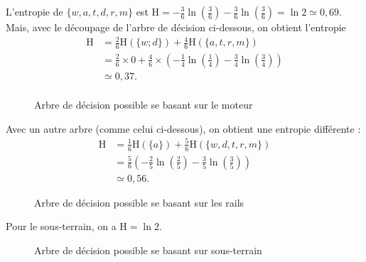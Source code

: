L'entropie de $\{w,a,t,d,r,m\}$\/ est $\mathrm{H} = -\frac{3}{6}\ln\left( \frac{3}{6} \right) - \frac{3}{6} \ln\left(\frac{3}{6}\right) = \ln 2 \simeq 0{,}69$.
Mais, avec le découpage de l'arbre de décision ci-dessous, on obtient l'entropie
\begin{align*}
	\mathrm{H} &= \frac{2}{6} \mathrm{H}(\{w;d\}) + \frac{4}{6} \mathrm{H}(\{a,t,r,m\}) \\
	&= \frac{2}{6} \times  0 + \frac{4}{6} \times \left( -\frac{1}{4} \ln\left(\frac{1}{4}\right) - \frac{3}{4} \ln\left( \frac{3}{4} \right) \right) \\
	&\simeq 0{,}37.  \\
\end{align*}
\begin{figure}[H]
	\centering
	\caption{Arbre de décision possible se basant sur le moteur}
\end{figure}

Avec un autre arbre (comme celui ci-dessous), on obtient une entropie différente :
\begin{align*}
	\mathrm{H} &= \frac{1}{6}\mathrm{H}(\{a\}) + \frac{5}{6} \mathrm{H}(\{w,d,t,r,m\})\\
	&= \frac{5}{6} \left( -\frac{2}{5} \ln\left( \frac{2}{5} \right) - \frac{3}{5} \ln\left( \frac{3}{5} \right) \right) \\
	&\simeq 0{,}56.
\end{align*}
\begin{figure}[H]
	\centering
	\caption{Arbre de décision possible se basant sur les rails}
\end{figure}

Pour le sous-terrain, on a $\mathrm{H} = \ln 2$.
\begin{figure}[H]
	\centering
	\caption{Arbre de décision possible se basant sur sous-terrain}
\end{figure}


